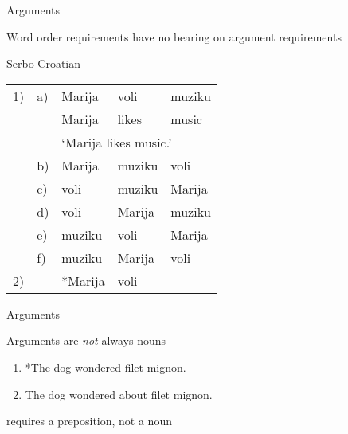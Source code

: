 \documentclass{beamer}
\newcommand{\subonefour}{Arguments}
\begin{document}
      \begin{frame}{\subonefour}
        \begin{block}{}
          Word order requirements have no bearing on argument requirements
        \end{block}
        \begin{block}{Serbo-Croatian}
          \begin{tabular}{@{} l l l l l @{}}
            1)  & a)  & Marija  & voli    & muziku \\
                &     & Marija  & likes   & music \\
                &     & \multicolumn{3}{l}{`Marija likes music.'} \\
                & b)  & Marija  & muziku  & voli \\
                & c)  & voli    & muziku  & Marija \\
                & d)  & voli    & Marija  & muziku \\
                & e)  & muziku  & voli    & Marija \\
                & f)  & muziku  & Marija  & voli \\
            2)  &     & *Marija & voli    &
          \end{tabular}
        \end{block}
      \end{frame}

      \begin{frame}{\subonefour}
        \begin{block}{}
          Arguments are \emph{not} always nouns
        \end{block}
        \begin{example}
          \begin{enumerate}
            \item *The dog wondered filet mignon.
            \item The dog wondered about filet mignon.
          \end{enumerate}
        \end{example}
        \begin{block}{}
           requires a preposition, not a noun
        \end{block}
      \end{frame}
\end{document}
